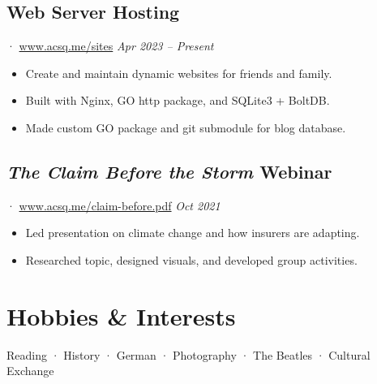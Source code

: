 \documentclass[12pt]{article}
\newcommand{\itemspace}{\vspace{0.3170em}}
\renewcommand{\textsc}[1]{\uppercase{\footnotesize#1}\normalsize}
\begin{document}
\itemspace

\subsection{Web Server Hosting} ·
\href{https://www.acsq.me/sites}{www.acsq.me/sites}
\hfill \textit{Apr 2023 -- Present}

\begin{itemize}[noitemsep,nolistsep]
  \item Create and maintain dynamic websites for friends and family.

  \item Built with Nginx, \textsc{go} http package, and SQLite3 + BoltDB.

  \item Made custom \textsc{go} package and git submodule for blog database.
\end{itemize}

\itemspace

\subsection{\textit{The Claim Before the Storm} Webinar}
· \href{https://www.acsq.me/claim-before.pdf}{www.acsq.me/claim-before.pdf}
\hfill \textit{Oct 2021}

\begin{itemize}[noitemsep,nolistsep]
  \item Led presentation on climate change and how insurers are adapting.

  \item Researched topic, designed visuals, and developed group activities.
\end{itemize}

\itemspace

\section{Hobbies \& Interests}

Reading · History · German · Photography · The Beatles · Cultural Exchange
\end{document}
